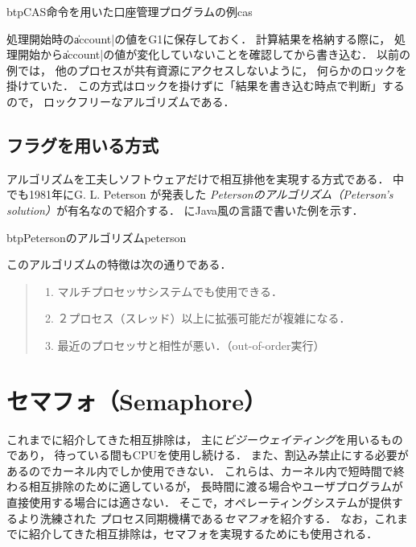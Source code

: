 \begin{itemize}
  \begin{myfig}{btp}{CAS命令を用いた口座管理プログラムの例}{cas}
    
  \end{myfig}

  処理開始時の\|account|の値をG1に保存しておく．
  計算結果を格納する際に，
  処理開始から\|account|の値が変化していないことを確認してから書き込む．
  以前の例では，
  他のプロセスが共有資源にアクセスしないように，
  何らかのロックを掛けていた．
  この方式はロックを掛けずに「結果を書き込む時点で判断」するので，
  ロックフリーなアルゴリズムである．
\end{itemize}

\subsection{フラグを用いる方式}
アルゴリズムを工夫しソフトウェアだけで相互排他を実現する方式である．
中でも1981年にG. L. Peterson が発表した
\emph{Petersonのアルゴリズム（Peterson's solution）}が有名なので紹介する．
にJava風の言語で書いた例を示す．

\begin{myfig}{btp}{Petersonのアルゴリズム}{peterson}
  
\end{myfig}

このアルゴリズムの特徴は次の通りである．

\begin{quote}
  \begin{enumerate}
  \item マルチプロセッサシステムでも使用できる．
  \item ２プロセス（スレッド）以上に拡張可能だが複雑になる．
  \item 最近のプロセッサと相性が悪い．（out-of-order実行）
  \end{enumerate}
\end{quote}

\section{セマフォ（Semaphore）}
これまでに紹介してきた相互排除は，
主に\emph{ビジーウェイティング}を用いるものであり，
待っている間もCPUを使用し続ける．
また、割込み禁止にする必要があるのでカーネル内でしか使用できない．
これらは、カーネル内で短時間で終わる相互排除のために適しているが，
長時間に渡る場合やユーザプログラムが直接使用する場合には適さない．
そこで，オペレーティングシステムが提供するより洗練された
プロセス同期機構である\emph{セマフォ}を紹介する．
なお，これまでに紹介してきた相互排除は，セマフォを実現するためにも使用される．

